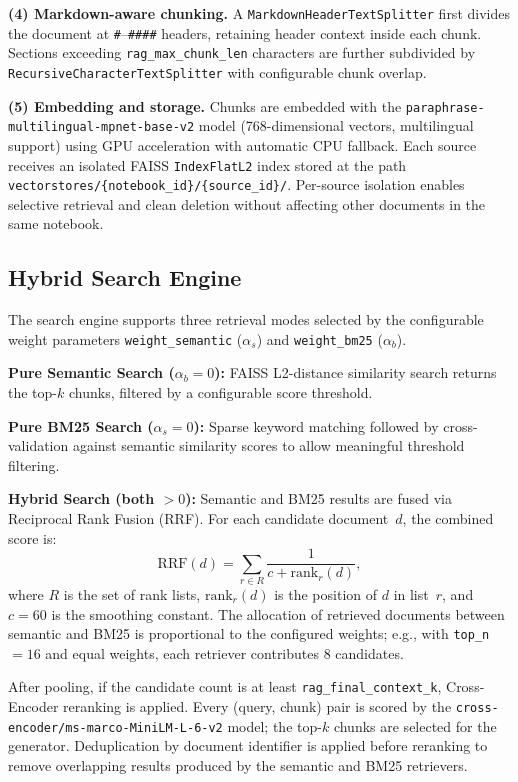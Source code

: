 \documentclass[10pt, conference, a4paper, compsocconf]{IEEEtran}
\begin{document}
\textbf{(4) Markdown-aware chunking.} A
\texttt{MarkdownHeaderTextSplitter} first divides the document at
\texttt{\#}--\texttt{\#\#\#\#} headers, retaining header context inside
each chunk. Sections exceeding \texttt{rag\_max\_chunk\_len} characters
are further subdivided by \texttt{RecursiveCharacterTextSplitter} with
configurable chunk overlap.

\textbf{(5) Embedding and storage.} Chunks are embedded with the
\texttt{paraphrase-multilingual-mpnet-base-v2}
model (768-dimensional vectors, multilingual support)
using GPU acceleration with automatic CPU fallback. Each source receives an isolated FAISS \texttt{IndexFlatL2}
index stored at the path
\texttt{vectorstores/\{notebook\_id\}/\{source\_id\}/}. Per-source
isolation enables selective retrieval and clean deletion without affecting
other documents in the same notebook.

\subsection{Hybrid Search Engine}

The search engine supports three retrieval modes selected by the
configurable weight parameters \texttt{weight\_semantic} ($\alpha_s$)
and \texttt{weight\_bm25} ($\alpha_b$).

\textbf{Pure Semantic Search ($\alpha_b = 0$):} FAISS L2-distance
similarity search returns the top-$k$ chunks, filtered by a configurable
score threshold.

\textbf{Pure BM25 Search ($\alpha_s = 0$):} Sparse keyword matching
followed by cross-validation against semantic similarity scores to allow
meaningful threshold filtering.

\textbf{Hybrid Search (both $> 0$):} Semantic and BM25 results are fused
via Reciprocal Rank Fusion (RRF). For each candidate document~$d$, the
combined score is:
\begin{equation}
  \text{RRF}(d) = \sum_{r \in R} \frac{1}{c + \text{rank}_r(d)},
  \label{eq:rrf}
\end{equation}
where $R$ is the set of rank lists, $\text{rank}_r(d)$ is the position of
$d$ in list~$r$, and $c = 60$ is the smoothing constant. The allocation of
retrieved documents between semantic and BM25 is proportional to the
configured weights; e.g., with \texttt{top\_n}~$= 16$ and equal weights,
each retriever contributes 8 candidates.

After pooling, if the candidate count is at least
\texttt{rag\_final\_context\_k}, Cross-Encoder reranking is applied.
Every (query, chunk) pair is scored by the
\texttt{cross-encoder/ms-marco-MiniLM-L-6-v2} model; the top-$k$ chunks
are selected for the generator. Deduplication by document identifier
is applied before reranking to remove overlapping results produced by
the semantic and BM25 retrievers.
\end{document}
